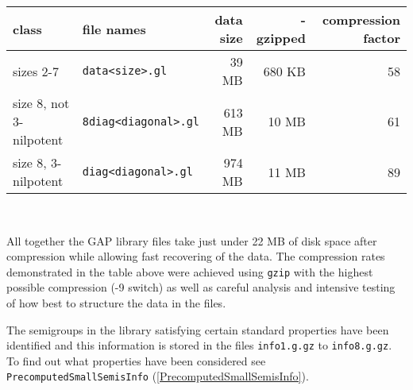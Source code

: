 \documentclass[a4paper,11pt]{report}
\begin{document}
{{ \begin{center}
\begin{tabular}{l|l|r|r|r}class&
file names&
data size&
- gzipped&
compression factor\\
\hline
sizes 2-7&
\texttt{data{\textless}size{\textgreater}.gl}&
39 MB&
680 KB&
58\\
size 8, not 3-nilpotent&
\texttt{8diag{\textless}diagonal{\textgreater}.gl}&
613 MB&
10 MB&
61\\
size 8, 3-nilpotent&
\texttt{diag{\textless}diagonal{\textgreater}.gl}&
974 MB&
11 MB&
89\\
\end{tabular}\\[2mm]
\end{center}

 All together the \textsf{GAP} library files take just under 22 MB of disk space after compression while
allowing fast recovering of the data. The compression rates demonstrated in
the table above were achieved using \texttt{gzip} with the highest possible compression (-9 switch) as well as careful analysis
and intensive testing of how best to structure the data in the files.

 The semigroups in the library satisfying certain standard properties have been
identified and this information is stored in the files \texttt{info1.g.gz} to \texttt{info8.g.gz}. To find out what properties have been considered see \texttt{PrecomputedSmallSemisInfo} (\ref{PrecomputedSmallSemisInfo}). }

 }

 
\end{document}
